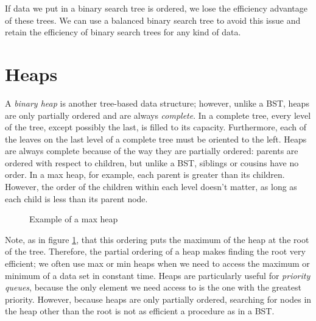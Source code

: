 If data we put in a binary search tree is ordered, we lose the efficiency advantage of these trees.
We can use a balanced binary search tree to avoid this issue and retain the efficiency of binary search trees for any kind of data.

\section*{Heaps}
A \emph{binary heap} is another tree-based data structure; however, unlike a BST, heaps are only partially ordered and are always \emph{complete}.
In a complete tree, every level of the tree, except possibly the last, is filled to its capacity.
Furthermore, each of the leaves on the last level of a complete tree must be oriented to the left.
Heaps are always complete because of the way they are partially ordered: parents are ordered with respect to children, but unlike a BST, siblings or cousins have no order.
In a max heap, for example, each parent is greater than its children.
However, the order of the children within each level doesn't matter, as long as each child is less than its parent node.
\begin{figure}
\begin{centering}
\end{centering}
\caption{Example of a max heap}
\label{fig:Max Heap}
\end{figure}
Note, as in figure \ref{fig:Max Heap}, that this ordering puts the maximum of the heap at the root of the tree.
Therefore, the partial ordering of a heap makes finding the root very efficient; we often use max or min heaps when we need to access the maximum or minimum of a data set in constant time.
Heaps are particularly useful for \emph{priority queues}, because the only element we need access to is the one with the greatest priority.
However, because heaps are only partially ordered, searching for nodes in the heap other than the root is not as efficient a procedure as in a BST.

